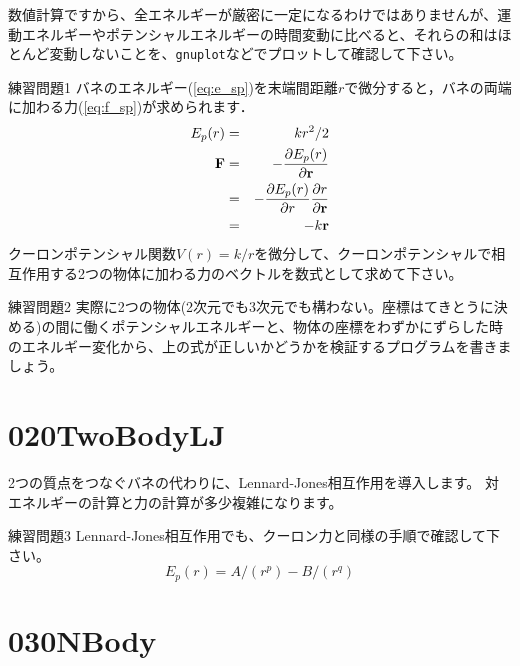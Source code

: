 \documentclass[a4,10pt]{article}
\begin{document}
数値計算ですから、全エネルギーが厳密に一定になるわけではありませんが、運動エネルギーやポテンシャルエネルギーの時間変動に比べると、それらの和はほとんど変動しないことを、{\tt gnuplot}などでプロットして確認して下さい。

\begin{itembox}[l]{練習問題1}
バネのエネルギー(\ref{eq:e_sp})を末端間距離$r$で微分すると，バネの両端に加わる力(\ref{eq:f_sp})が求められます．
\begin{eqnarray}
E_p(r)&=&kr^2/2\\
{\bf F}&=&-\frac{\partial E_p(r)}{\partial {\bf r}}\\
&=&-\frac{\partial E_p(r)}{\partial r}\frac{\partial r}{\partial {\bf r}}\\
&=&-k{\bf r}
\end{eqnarray}
クーロンポテンシャル関数$V(r) = k / r$を微分して、クーロンポテンシャルで相互作用する2つの物体に加わる力のベクトルを数式として求めて下さい。
\end{itembox}

\begin{itembox}[l]{練習問題2}
実際に2つの物体(2次元でも3次元でも構わない。座標はてきとうに決める)の間に働くポテンシャルエネルギーと、物体の座標をわずかにずらした時のエネルギー変化から、上の式が正しいかどうかを検証するプログラムを書きましょう。
\end{itembox}

\section{020TwoBodyLJ}

2つの質点をつなぐバネの代わりに、Lennard-Jones相互作用を導入します。
対エネルギーの計算と力の計算が多少複雑になります。

\begin{itembox}[l]{練習問題3}
Lennard-Jones相互作用でも、クーロン力と同様の手順で確認して下さい。
\begin{equation}
    E_p(r) = A/(r^p) - B/(r^q)
\end{equation}
\end{itembox}


\section{030NBody}
\end{document}
